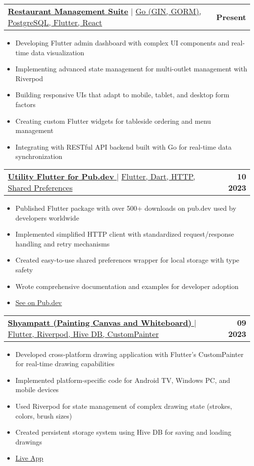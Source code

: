 \documentclass[letterpaper,11pt]{article}
\makeatletter
\newcommand{\resumeItem}[1]{
  \item\small{
    {#1 \vspace{-2pt}}
  }
}
\newcommand{\resumeProjectHeading}[2]{
    \item
    \begin{tabular*}{1.001\textwidth}{l@{\extracolsep{\fill}}r}
      \small#1 & \textbf{\small #2}\\
    \end{tabular*}\vspace{-7pt}
}
\newcommand{\resumeItemListStart}{\begin{itemize}}
\newcommand{\resumeItemListEnd}{\end{itemize}\vspace{-5pt}}
\makeatother
\begin{document}
\resumeProjectHeading
{\textbf{\large{\underline{Restaurant Management Suite}}} $|$ \large{\underline{Go (GIN, GORM), PostgreSQL, Flutter, React}}}{Present}
\resumeItemListStart
\resumeItem{\normalsize{Developing Flutter admin dashboard with complex UI components and real-time data visualization}}
\resumeItem{\normalsize{Implementing advanced state management for multi-outlet management with Riverpod}}
\resumeItem{\normalsize{Building responsive UIs that adapt to mobile, tablet, and desktop form factors}}
\resumeItem{\normalsize{Creating custom Flutter widgets for tableside ordering and menu management}}
\resumeItem{\normalsize{Integrating with RESTful API backend built with Go for real-time data synchronization}}
\resumeItemListEnd
\vspace{-13pt}

\resumeProjectHeading
{\href{https://pub.dev/packages/utility_flutter}{\textbf{\large{\underline{Utility Flutter for Pub.dev}}} \href{https://pub.dev/packages/utility_flutter}{\raisebox{-0.1\height}\faLink }} $|$ \large{\underline{Flutter, Dart, HTTP, Shared Preferences}}}{10 2023}
\resumeItemListStart
\resumeItem{\normalsize{Published Flutter package with over 500+ downloads on pub.dev used by developers worldwide}}
\resumeItem{\normalsize{Implemented simplified HTTP client with standardized request/response handling and retry mechanisms}}
\resumeItem{\normalsize{Created easy-to-use shared preferences wrapper for local storage with type safety}}
\resumeItem{\normalsize{Wrote comprehensive documentation and examples for developer adoption}}
\resumeItem{\textcolor{accent}{\href{https://pub.dev/packages/utility_flutter}{\underline{\normalsize{See on Pub.dev}}}}}
\resumeItemListEnd
\vspace{-13pt}

\resumeProjectHeading
{\href{https://play.google.com/store/apps/details?id=com.mylight.shyampatt}{\textbf{\large{\underline{Shyampatt (Painting Canvas and Whiteboard)}}} \href{https://play.google.com/store/apps/details?id=com.mylight.shyampatt}{\raisebox{-0.1\height}\faLink }} $|$ \large{\underline{Flutter, Riverpod, Hive DB, CustomPainter}}}{09 2023}
\resumeItemListStart
\resumeItem{\normalsize{Developed cross-platform drawing application with Flutter's CustomPainter for real-time drawing capabilities}}
\resumeItem{\normalsize{Implemented platform-specific code for Android TV, Windows PC, and mobile devices}}
\resumeItem{\normalsize{Used Riverpod for state management of complex drawing state (strokes, colors, brush sizes)}}
\resumeItem{\normalsize{Created persistent storage system using Hive DB for saving and loading drawings}}
\resumeItem{\textcolor{accent}{\href{https://play.google.com/store/apps/details?id=com.mylight.shyampatt}{\underline{\normalsize{Live App}}}}}
\resumeItemListEnd
\vspace{-13pt}
\end{document}
